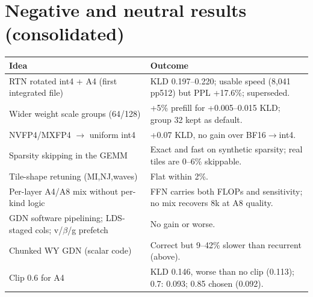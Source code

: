 \documentclass[10pt,a4paper]{article}
\begin{document}
\section{Negative and neutral results (consolidated)}
\label{sec:neg}

\begin{center}\small
\begin{tabularx}{\linewidth}{@{}>{\raggedright\arraybackslash}p{3.6cm}X@{}}
\toprule
Idea & Outcome\\
\midrule
RTN rotated int4 + A4 (first integrated file) & KLD 0.197--0.220; usable speed (8{,}041 pp512) but PPL +17.6\%; superseded.\\
Wider weight scale groups (64/128) & +5\% prefill for +0.005--0.015 KLD; group 32 kept as default.\\
NVFP4/MXFP4 $\to$ uniform int4 & +0.07 KLD, no gain over BF16$\to$int4.\\
Sparsity skipping in the GEMM & Exact and fast on synthetic sparsity; real tiles are 0--6\% skippable.\\
Tile-shape retuning (MI,NJ,waves) & Flat within 2\%.\\
Per-layer A4/A8 mix without per-kind logic & FFN carries both FLOPs and sensitivity; no mix recovers 8k at A8 quality.\\
GDN software pipelining; LDS-staged cols; v/$\beta$/g prefetch & No gain or worse.\\
Chunked WY GDN (scalar code) & Correct but 9--42\% slower than recurrent (above).\\
Clip 0.6 for A4 & KLD 0.146, worse than no clip (0.113); 0.7: 0.093; 0.85 chosen (0.092).\\
\bottomrule
\end{tabularx}
\end{center}
\end{document}
